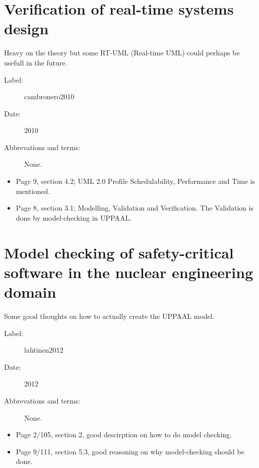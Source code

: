 \section{Verification of real-time systems design}
Heavy on the theory but some RT-UML (Real-time UML) could perhaps be usefull in
the future.

\begin{description}
    \item[Label:] cambronero2010 \cite{cambronero2010}
    \item[Date:] 2010
    \item[Abbrevations and terms:] None.
\end{description}

\begin{itemize}
    \item Page 9, section 4.2; UML 2.0 Profile Schedulability, Performance and
        Time is mentioned.
    \item Page 8, section 3.1; Modelling, Validation and Verification. The
        Validation is done by model-checking in UPPAAL.
\end{itemize}

\section{Model checking of safety-critical software in the nuclear engineering
domain}
Some good thoughts on how to actually create the UPPAAL model.

\begin{description}
    \item[Label:] lahtinen2012 \cite{lahtinen2012}
    \item[Date:] 2012
    \item[Abbrevations and terms:] None.
\end{description}

\begin{itemize}
    \item Page 2/105, section 2, good descirption on how to do model checking.
    \item Page 9/111, section 5.3, good reasoning on why model-checking should
        be done.
\end{itemize}

